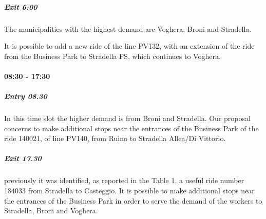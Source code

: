 \subparagraph{Exit 6:00} The municipalities with the highest demand are Voghera, Broni and Stradella. 

It is possible to add a new ride of the line PV132, with an extension of the ride from the Business Park to Stradella FS, which continues to Voghera.

\paragraph{08:30 - 17:30}

\subparagraph{Entry 08.30}In this time slot the higher demand is from Broni and Stradella. Our proposal concerns to make additional stops near the entrances of the Business Park of the ride 140021, of line PV140, from Ruino to Stradella Allea/Di Vittorio.

\subparagraph{Exit 17.30}previously it was identified, as reported in the Table 1, a useful ride number 184033 from Stradella to Casteggio. It is possible to make additional stops near the entrances of the Business Park in order to serve the demand of the workers to Stradella, Broni and Voghera.




